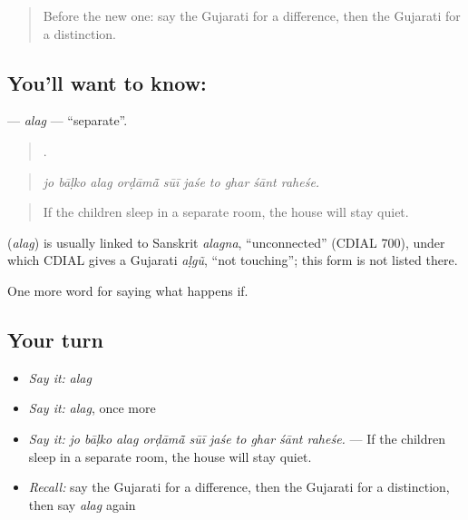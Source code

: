 \label{lesson:GU-C544-alag}



\begin{quote}
Before the new one: say the Gujarati for a difference, then the Gujarati for a distinction.
\end{quote}

\subsection*{You'll want to know: }
\textbf{} — \emph{alag} — \textquotedblleft{}separate\textquotedblright{}.

\begin{quote}
         .
\end{quote}

\begin{quote}
\emph{jo bāḷko alag orḍāmā̃ sūī jaśe to ghar śānt raheśe.}
\end{quote}

\begin{quote}
If the children sleep in a separate room, the house will stay quiet.
\end{quote}

\begin{cousinweb}
\textbf{} (\emph{alag}) is usually linked to Sanskrit \emph{alagna}, \textquotedblleft{}unconnected\textquotedblright{} (CDIAL 700), under which CDIAL gives a Gujarati \emph{aḷgũ}, \textquotedblleft{}not touching\textquotedblright{}; this form is not listed there.
\end{cousinweb}

\begin{grammarlens}[title={What you've built}]
One more word for saying what happens if.
\end{grammarlens}

\subsection*{Your turn}
\begin{itemize}
\raggedright
  \item \emph{Say it:} \emph{alag}
  \item \emph{Say it:} \emph{alag}, once more
  \item \emph{Say it:} \emph{jo bāḷko alag orḍāmā̃ sūī jaśe to ghar śānt raheśe.} — If the children sleep in a separate room, the house will stay quiet.
  \item \emph{Recall:} say the Gujarati for a difference, then the Gujarati for a distinction, then say \emph{alag} again
\end{itemize}

